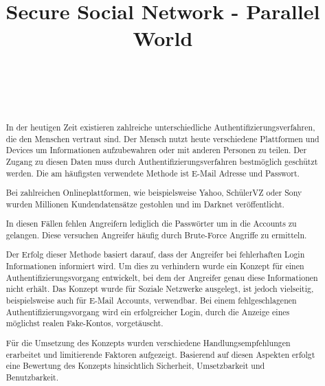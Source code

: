 \documentclass{sigchi}
\def\plaintitle{Secure Social Network - Parallel World}
\begin{document}
\title{\plaintitle}

\author{%
  \\
  \\
  \\
}

\maketitle

\begin{abstract}
In der heutigen Zeit existieren zahlreiche unterschiedliche Authentifizierungsverfahren, die den Menschen vertraut sind. Der Mensch nutzt heute verschiedene Plattformen und Devices um Informationen aufzubewahren oder mit anderen Personen zu teilen. Der Zugang zu diesen Daten muss durch Authentifizierungsverfahren bestmöglich geschützt werden. Die am häufigsten verwendete Methode ist E-Mail Adresse und Passwort.\cite{passwordsCommon}

Bei zahlreichen Onlineplattformen, wie beispielsweise Yahoo, SchülerVZ oder Sony wurden Millionen Kundendatensätze gestohlen und im Darknet veröffentlicht.\cite{darknetYahoo}

In diesen Fällen fehlen Angreifern lediglich die Passwörter um in die Accounts zu gelangen. Diese versuchen Angreifer häufig durch Brute-Force Angriffe zu ermitteln.\cite{bruteForce}

Der Erfolg dieser Methode basiert darauf, dass der Angreifer bei fehlerhaften Login Informationen informiert wird. Um dies zu verhindern wurde ein Konzept für einen Authentifizierungsvorgang entwickelt, bei dem der Angreifer genau diese Informationen nicht erhält. Das Konzept wurde für Soziale Netzwerke ausgelegt, ist jedoch vielseitig, beispielsweise auch für E-Mail Accounts, verwendbar. Bei einem fehlgeschlagenen Authentifizierungsvorgang wird ein erfolgreicher Login, durch die Anzeige eines möglichst realen Fake-Kontos, vorgetäuscht.

Für die Umsetzung des Konzepts wurden verschiedene Handlungsempfehlungen erarbeitet und limitierende Faktoren aufgezeigt. Basierend auf diesen Aspekten erfolgt eine Bewertung des Konzepts hinsichtlich Sicherheit, Umsetzbarkeit und Benutzbarkeit. 
\end{abstract}
\end{document}
